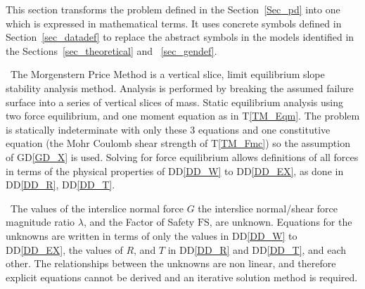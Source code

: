 \documentclass[12pt]{article}
\newcommand{\tref}[1]{T\ref{#1}}
\newcommand{\ddref}[1]{DD\ref{#1}}
\newcommand{\dref}[1]{GD\ref{#1}}
\begin{document}
This section transforms the problem defined in the
Section~\ref{Sec_pd} into one which is expressed in mathematical
terms. It uses concrete symbols defined in Section~\ref{sec_datadef}
to replace the abstract symbols in the models identified in the
Sections~\ref{sec_theoretical} and ~\ref{sec_gendef}.

~\newline\noindent The Morgenstern Price Method is a vertical slice,
limit equilibrium slope stability analysis method. Analysis is
performed by breaking the assumed failure surface into a series of
vertical slices of mass. Static equilibrium analysis using two force
equilibrium, and one moment equation as in \tref{TM_Eqm}. The problem
is statically indeterminate with only these 3 equations and one
constitutive equation (the Mohr Coulomb shear strength of
\tref{TM_Fmc}) so the assumption of \dref{GD_X} is used. Solving for
force equilibrium allows definitions of all forces in terms of the
physical properties of \ddref{DD_W} to \ddref{DD_EX}, as done in
\ddref{DD_R}, \ddref{DD_T}.

~\newline\noindent The values of the interslice normal force $G$ the
interslice normal/shear force magnitude ratio $\lambda$, and the
Factor of Safety $\text{FS}$, are unknown. Equations for the unknowns
are written in terms of only the values in \ddref{DD_W} to
\ddref{DD_EX}, the values of $R$, and $T$ in
\ddref{DD_R} and \ddref{DD_T}, and each other. The relationships
between the unknowns are non linear, and therefore explicit equations
cannot be derived and an iterative solution method is required.


~\newline

\end{document}

